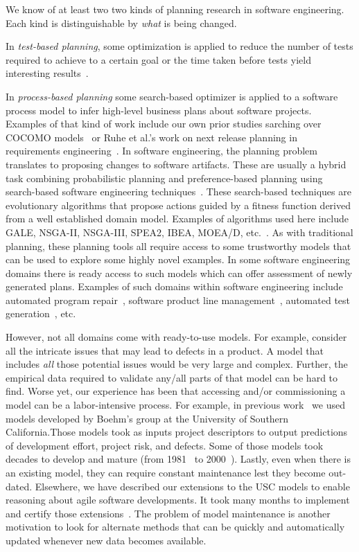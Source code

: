 We know of at least two two kinds of planning research in software engineering. Each kind is distinguishable by {\em what} is being changed.
\bi
\item
In {\em test-based planning}, some optimization is applied to reduce the number of tests required to achieve to a certain goal or the time taken before tests yield interesting results~\citep{tallam2006concept, yoo2012regression, blue2013interaction}.
\item
In {\em process-based planning} some search-based optimizer is applied to a software process model to infer high-level business plans about software projects. Examples of that kind of work include our own prior studies sarching over  COCOMO models~\cite{me07f,Menzies:2009:ADS} or Ruhe et al.'s work on next release planning in requirements engineering~\citep{ruhe2003quantitative, ruhe2010product}. 
\ei
In software engineering, the planning problem translates to proposing changes to software artifacts. These are usually a hybrid task combining probabilistic planning and preference-based planning using search-based software engineering techniques~\citep{Harman2009, Harman2011}. These search-based techniques are evolutionary algorithms that propose actions guided by a fitness function derived from a well established domain model. Examples of algorithms used here include GALE, NSGA-II, NSGA-III, SPEA2, IBEA, MOEA/D, etc.~\citep{krall2015gale, deb00a, zit02, zit04, deb14, Cui2005a, zhang07:TEC}. 
As with traditional planning, these planning tools all require access to some trustworthy models that can be used to explore some highly novel examples. In some software engineering domains there is ready access to such models which can offer assessment of newly generated plans. Examples of such domains within software engineering include automated program repair~\citep{Weimer2009, Goues12, LeGoues2015}, software product line management~\citep{sayyad13, metzger14, henard15}, automated test generation~\citep{andrews07, andrews10}, etc. 

However, not all domains come with ready-to-use models. For example, consider all the intricate issues that may lead to defects in a product. A model that includes {\em all} those potential issues would be very large and complex. Further, the empirical data required to validate any/all parts of that model can be hard to find. Worse yet, our experience has been that accessing and/or commissioning a model can be a labor-intensive process. For example, in previous work~\citep{me07f} we used models developed by Boehm's group at the University of Southern California.Those models took as inputs project descriptors to output predictions of development effort, project risk, and defects.
Some of those models took decades to develop and mature (from 1981~\citep{boehm81} to 2000~\citep{boehm00b}). Lastly, even when there is an existing model, they can require constant maintenance lest they become out-dated. Elsewhere, we have described our extensions to the USC models to enable reasoning about agile software developments. It took many months to implement and certify those extensions~\citep{me09i, me09j}. The problem of model maintenance is another motivation to look for alternate methods that can be quickly and automatically updated whenever new data becomes available.

